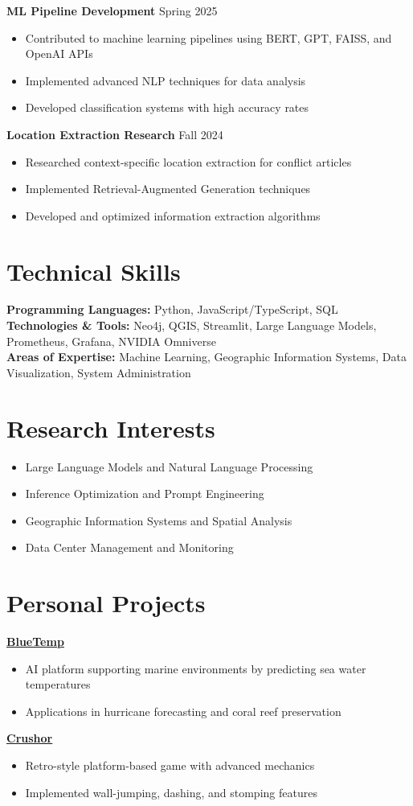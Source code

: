 \documentclass[11pt,a4paper]{article}
\begin{document}
\textbf{ML Pipeline Development} \hfill Spring 2025
\begin{itemize}[leftmargin=*]
    \item Contributed to machine learning pipelines using BERT, GPT, FAISS, and OpenAI APIs
    \item Implemented advanced NLP techniques for data analysis
    \item Developed classification systems with high accuracy rates
\end{itemize}

\textbf{Location Extraction Research} \hfill Fall 2024
\begin{itemize}[leftmargin=*]
    \item Researched context-specific location extraction for conflict articles
    \item Implemented Retrieval-Augmented Generation techniques
    \item Developed and optimized information extraction algorithms
\end{itemize}

\section*{Technical Skills}
\textbf{Programming Languages:} Python, JavaScript/TypeScript, SQL\\
\textbf{Technologies \& Tools:} Neo4j, QGIS, Streamlit, Large Language Models, Prometheus, Grafana, NVIDIA Omniverse\\
\textbf{Areas of Expertise:} Machine Learning, Geographic Information Systems, Data Visualization, System Administration

\section*{Research Interests}
\begin{itemize}[leftmargin=*]
    \item Large Language Models and Natural Language Processing
    \item Inference Optimization and Prompt Engineering
    \item Geographic Information Systems and Spatial Analysis
    \item Data Center Management and Monitoring
\end{itemize}

\section*{Personal Projects}
\textbf{\href{https://github.com/yahya3867/BlueTemp}{BlueTemp}}
\begin{itemize}[leftmargin=*]
    \item AI platform supporting marine environments by predicting sea water temperatures
    \item Applications in hurricane forecasting and coral reef preservation
\end{itemize}

\textbf{\href{https://github.com/yahya3867/Crushor}{Crushor}}
\begin{itemize}[leftmargin=*]
    \item Retro-style platform-based game with advanced mechanics
    \item Implemented wall-jumping, dashing, and stomping features
\end{itemize}
\end{document}
